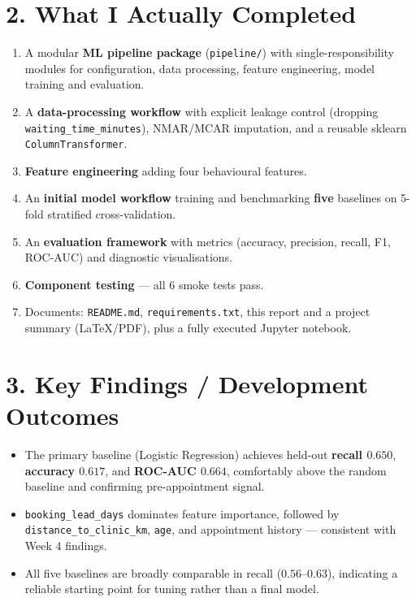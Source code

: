\documentclass[11pt,a4paper]{article}
\begin{document}
\section*{2. What I Actually Completed}
\begin{enumerate}
    \item A modular \textbf{ML pipeline package} (\texttt{pipeline/}) with single-responsibility
          modules for configuration, data processing, feature engineering, model training and
          evaluation.
    \item A \textbf{data-processing workflow} with explicit leakage control (dropping
          \texttt{waiting\_time\_minutes}), NMAR/MCAR imputation, and a reusable sklearn
          \texttt{ColumnTransformer}.
    \item \textbf{Feature engineering} adding four behavioural features.
    \item An \textbf{initial model workflow} training and benchmarking \textbf{five} baselines on
          5-fold stratified cross-validation.
    \item An \textbf{evaluation framework} with metrics (accuracy, precision, recall, F1, ROC-AUC)
          and diagnostic visualisations.
    \item \textbf{Component testing} — all 6 smoke tests pass.
    \item Documents: \texttt{README.md}, \texttt{requirements.txt}, this report and a project
          summary (LaTeX/PDF), plus a fully executed Jupyter notebook.
\end{enumerate}

\section*{3. Key Findings / Development Outcomes}
\begin{itemize}
    \item The primary baseline (Logistic Regression) achieves held-out \textbf{recall $0.650$},
          \textbf{accuracy $0.617$}, and \textbf{ROC-AUC $0.664$}, comfortably above the random
          baseline and confirming pre-appointment signal.
    \item \texttt{booking\_lead\_days} dominates feature importance, followed by
          \texttt{distance\_to\_clinic\_km}, \texttt{age}, and appointment history — consistent with
          Week 4 findings.
    \item All five baselines are broadly comparable in recall ($0.56$–$0.63$), indicating a
          reliable starting point for tuning rather than a final model.
\end{itemize}
\end{document}
